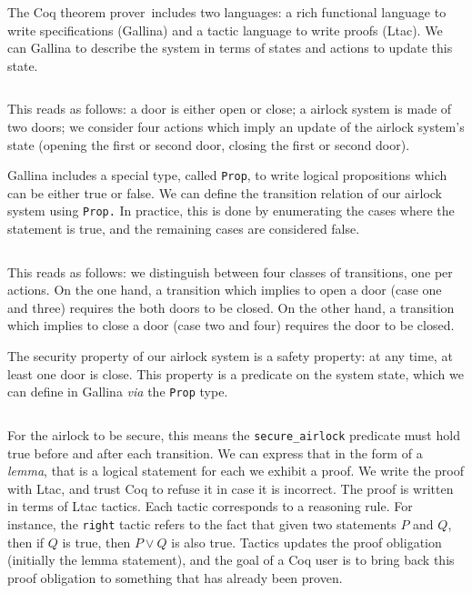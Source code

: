 \begin{example}
  The Coq theorem prover\,\cite{coq} includes two languages: a rich functional
  language to write specifications ({\sc Gallina}) and a tactic language to
  write proofs ({\sc Ltac}).
  We can {\sc Gallina} to describe the system in terms of states and actions to
  update this state.

  \inputminted[firstline=1,lastline=14]{coq}{Listings/Airlock.v}

  This reads as follows: a door is either open or close; a airlock system is
  made of two doors; we consider four actions which imply an update of the
  airlock system's state (opening the first or second door, closing the first or
  second door).

  {\sc Gallina} includes a special type, called \texttt{Prop}, to write logical
  propositions which can be either true or false.
  We can define the transition relation of our airlock system using
  \texttt{Prop.}
  In practice, this is done by enumerating the cases where the statement is
  true, and the remaining cases are considered false.

  \inputminted[firstline=16,lastline=33]{coq}{Listings/Airlock.v}

  This reads as follows: we distinguish between four classes of transitions, one
  per actions.
  On the one hand, a transition which implies to open a door (case one and
  three) requires the both doors to be closed.
  On the other hand, a transition which implies to close a door (case two and
  four) requires the door to be closed.

  The security property of our airlock system is a safety property: at any time,
  at least one door is close.
  This property is a predicate on the system state, which we can define in {\sc
    Gallina} \emph{via} the \texttt{Prop} type.

  \inputminted[firstline=35,lastline=38]{coq}{Listings/Airlock.v}

  For the airlock to be secure, this means the \texttt{secure\_airlock}
  predicate must hold true before and after each transition.
  We can express that in the form of a \emph{lemma}, that is a logical statement
  for each we exhibit a proof.
  We write the proof with {\sc Ltac}, and trust Coq to refuse it in case it is
  incorrect.
  The proof is written in terms of {\sc Ltac} tactics.
  Each tactic corresponds to a reasoning rule.
  For instance, the \texttt{right} tactic refers to the fact that given two
  statements $P$ and $Q$, then if $Q$ is true, then $P \vee Q$ is also
  true. Tactics updates the proof obligation (initially the lemma statement),
  and the goal of a Coq user is to bring back this proof obligation to something
  that has already been proven.


\end{example}
